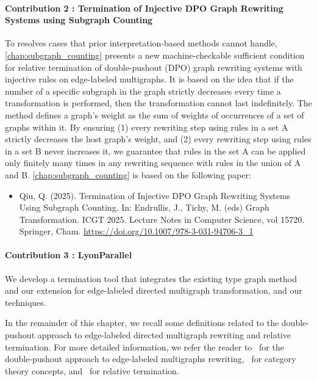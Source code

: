 \paragraph{Contribution 2 : Termination of Injective DPO Graph Rewriting Systems using Subgraph Counting} 
To resolves cases that prior interpretation-based methods cannot handle, 
\autoref{chap:subgraph_counting} presents a new machine-checkable sufficient condition for relative termination of double-pushout (DPO) graph rewriting systems with injective rules on edge-labeled multigraphs. 
It is based on the idea that if the number of a specific subgraph in the graph strictly decreases every time a transformation is performed, then the transformation cannot last indefinitely.
The method defines a graph's weight as the sum of weights of occurrences of a set of graphs within it. By ensuring 
(1) every rewriting step using rules in a set A strictly decreases the host graph's weight, and 
(2) every rewriting step using rules in a set B never increases it, we guarantee that rules in the set A can be applied only finitely many times in any rewriting sequence with rules in the union of A and B.  
\autoref{chap:subgraph_counting} is based on the following paper:
\begin{itemize}
    \item Qiu, Q. (2025). Termination of Injective DPO Graph Rewriting Systems Using Subgraph Counting. In: Endrullis, J., Tichy, M. (eds) Graph Transformation. ICGT 2025. Lecture Notes in Computer Science, vol 15720. Springer, Cham. \url{https://doi.org/10.1007/978-3-031-94706-3_1}
\end{itemize}

\paragraph{Contribution 3 : LyonParallel}
We develop a termination tool that integrates the existing 
    type graph method and our extension for edge-labeled directed multigraph transformation, and our techniques.


In the remainder of this chapter, we recall some definitions related to the double-pushout approach to edge-labeled directed multigraph rewriting and relative termination. For more detailed information, we refer the reader to~\cite{konig2018atutorial,corradini1997algebraic} for the double-pushout approach to edge-labeled multigraphs rewriting,~\cite{pierce1991basic,barr1990category} for category theory concepts, and~\cite{geser1990relative} for relative termination. 